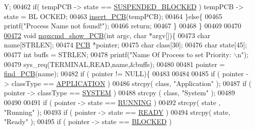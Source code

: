 \begin{DoxyCode}
      Y;
00462                 \textcolor{keywordflow}{if}( tempPCB -> state == \hyperlink{mpx__r2_8h_a6e41bb5a80c5049e8d364bab8ee4d73a}{SUSPENDED_BLOCKED} ) tempPCB -> state = BL
      OCKED;
00463                 \hyperlink{mpx__r2_8c_aa3b334e3a5afd6e590917667ad359a6f}{insert_PCB}(tempPCB);
00464         \}\textcolor{keywordflow}{else}\{
00465                 printf(\textcolor{stringliteral}{"Process Name not found!"});
00466                 \textcolor{keywordflow}{return};
00467         \}
00468 \}
00469 
00470 
\hypertarget{mpx__r2_8c_source_l00472}{}\hyperlink{mpx__r2_8h_ae52d77243725636a3b23d05235fee141}{00472} \textcolor{keywordtype}{void} \hyperlink{mpx__r2_8c_ae52d77243725636a3b23d05235fee141}{mpxcmd_show_PCB}(\textcolor{keywordtype}{int} argc, \textcolor{keywordtype}{char} *argv[])\{
00473         \textcolor{keywordtype}{char} name[STRLEN];
00474         \hyperlink{structprocess}{PCB} *pointer;
00475         \textcolor{keywordtype}{char} \textcolor{keyword}{class}[30];
00476         \textcolor{keywordtype}{char} state[45];
00477         \textcolor{keywordtype}{int} buffs = STRLEN;
00478         printf(\textcolor{stringliteral}{"Name Of Process to set Priority: \(\backslash\)n"});
00479         sys\_req(TERMINAL,READ,name,&buffs);
00480         
00481         pointer = \hyperlink{mpx__r2_8c_a612a6abcb66c688a32f33abc93ff3990}{find_PCB}(name);
00482         \textcolor{keywordflow}{if} ( pointer != NULL)\{
00483                 
00484                 
00485                 \textcolor{keywordflow}{if} ( pointer -> classType  == \hyperlink{mpx__r2_8h_a796bd7c6ba2e59281760fb155c6287e8}{APPLICATION} )
00486                         strcpy( \textcolor{keyword}{class}, \textcolor{stringliteral}{"Application"} );
00487                 \textcolor{keywordflow}{if} (  pointer -> classType == \hyperlink{mpx__r2_8h_a21b97df85e65556468b28a576311271c}{SYSTEM} )
00488                         strcpy ( \textcolor{keyword}{class}, \textcolor{stringliteral}{"System"} );
00489                 
00490                 
00491                 \textcolor{keywordflow}{if} ( pointer -> state == \hyperlink{mpx__r2_8h_a6fb7181d994ee98e735494be55809708}{RUNNING} ) 
00492                         strcpy( state , \textcolor{stringliteral}{"Running"} );
00493                 \textcolor{keywordflow}{if} ( pointer -> state == \hyperlink{mpx__r2_8h_ad1235d5ce36f7267285e82dccd428aa6}{READY} ) 
00494                         strcpy( state, \textcolor{stringliteral}{"Ready"} );
00495                 \textcolor{keywordflow}{if} ( pointer -> state == \hyperlink{mpx__r2_8h_a48f6457243719e7031768d4100741159}{BLOCKED} ) 

\end{DoxyCode}
